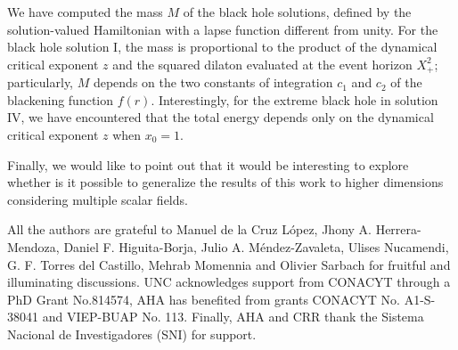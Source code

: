 \documentclass[sn-mathphys,Numbered]{sn-jnl}%
\theoremstyle{thmstyleone}%
\theoremstyle{thmstyletwo}%
\theoremstyle{thmstylethree}%
\begin{document}
We have computed the mass $M$ of the black hole solutions, defined by the solution-valued Hamiltonian with a lapse function different from unity. For the black hole solution I, the mass is proportional to the product of the dynamical critical exponent $z$ and the squared dilaton evaluated at the event horizon $X_+^2$; particularly, $M$ depends on the two constants of integration $c_1$ and $c_2$ of the blackening function $f(r)$. Interestingly, for the extreme black hole in solution IV, we have encountered that the total energy depends only on the dynamical critical exponent $z$ when $x_0=1$.

Finally, we would like to point out that it would be interesting to explore whether is it possible to generalize the results of this work to higher dimensions considering multiple scalar fields.


All the authors are grateful to Manuel de la Cruz López, Jhony A. Herrera-Mendoza, Daniel F. Higuita-Borja, Julio A. Méndez-Zavaleta, Ulises Nucamendi, G. F. Torres del Castillo, Mehrab Momennia and Olivier Sarbach for fruitful and illuminating discussions. UNC acknowledges support from CONACYT through a PhD Grant No.814574, AHA has benefited from grants CONACYT No. A1-S-38041 and
VIEP-BUAP No. 113. Finally, AHA and CRR thank the Sistema Nacional de Investigadores (SNI) for support.

\end{document}
